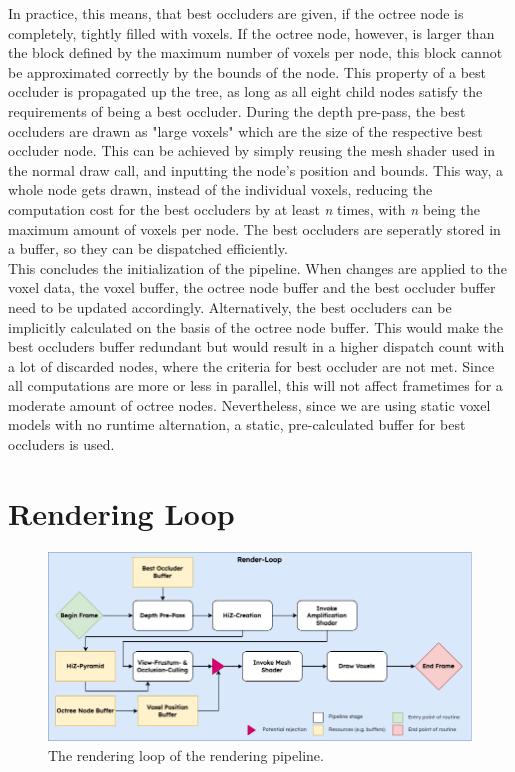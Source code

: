 \noindent
In practice, this means, that best occluders are given, if the octree node is completely, tightly filled 
with voxels. If the octree node, however, is larger than the block defined by the maximum number of voxels 
per node, this block cannot be approximated correctly by the bounds of the node. This property of a best 
occluder is propagated up the tree, as long as all eight child nodes satisfy the requirements of being a 
best occluder. During the depth pre-pass, the best occluders are drawn as "large voxels" which are the size 
of the respective best occluder node. This can be achieved by simply reusing the mesh shader used in the 
normal draw call, and inputting the node's position and bounds. This way, a whole node gets drawn, instead 
of the individual voxels, reducing the computation cost for the best occluders by at least \emph{n} times, 
with \emph{n} being the maximum amount of voxels per node. The best occluders are seperatly stored in a 
buffer, so they can be dispatched efficiently. \\


\noindent
This concludes the initialization of the pipeline. When changes are applied to the voxel data, the voxel buffer,
the octree node buffer and the best occluder buffer need to be updated accordingly. Alternatively, the best 
occluders can be implicitly calculated on the basis of the octree node buffer. This would make the best 
occluders buffer redundant but would result in a higher dispatch count with a lot of discarded nodes, 
where the criteria for best occluder are not met. Since all computations are more or less in parallel, this 
will not affect frametimes for a moderate amount of octree nodes. Nevertheless, since we are using static 
voxel models with no runtime alternation, a static, pre-calculated buffer for best occluders is used.


\section{Rendering Loop} \label{sec-rendering-loop}

\begin{figure}[h]
    \centering
    \includegraphics[width=\linewidth]{images/graphics/render-loop.png}
    \caption{The rendering loop of the rendering pipeline.}
    \label{fig:pipeline-loop}
\end{figure}

